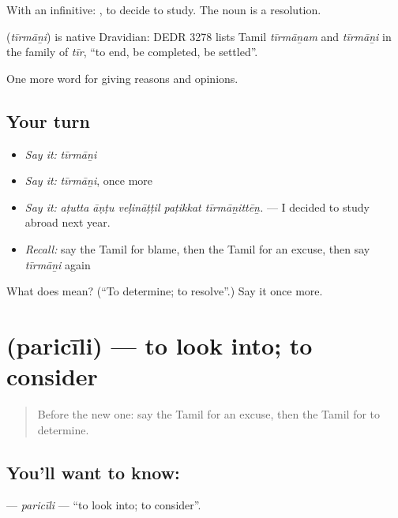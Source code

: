 With an infinitive:  , to decide to study. The noun  is a resolution.

\begin{cousinweb}
\textbf{} (\emph{tīrmāṉi}) is native Dravidian: DEDR 3278 lists Tamil \emph{tīrmāṉam} and \emph{tīrmāṉi} in the family of \emph{tīr}, \textquotedblleft{}to end, be completed, be settled\textquotedblright{}.
\end{cousinweb}

\begin{grammarlens}[title={What you've built}]
One more word for giving reasons and opinions.
\end{grammarlens}

\subsection*{Your turn}
\begin{itemize}
\raggedright
  \item \emph{Say it:} \emph{tīrmāṉi}
  \item \emph{Say it:} \emph{tīrmāṉi}, once more
  \item \emph{Say it:} \emph{aṭutta āṇṭu veḷināṭṭil paṭikkat tīrmāṉittēṉ.} — I decided to study abroad next year.
  \item \emph{Recall:} say the Tamil for blame, then the Tamil for an excuse, then say \emph{tīrmāṉi} again
\end{itemize}

\begin{tcolorbox}[breakable,colback=teal!4,colframe=teal!35!black,title={Before you move on}]
What does  mean? (\textquotedblleft{}To determine; to resolve\textquotedblright{}.) Say it once more.
\end{tcolorbox}
\section[\texorpdfstring{\ta{பரிசீலி} (paricīli)}{பரிசீலி (paricīli)}]{ (paricīli) — to look into; to consider}

\label{lesson:TA-C361-paricili}



\begin{quote}
Before the new one: say the Tamil for an excuse, then the Tamil for to determine.
\end{quote}

\subsection*{You'll want to know: }
\textbf{} — \emph{paricīli} — \textquotedblleft{}to look into; to consider\textquotedblright{}.

